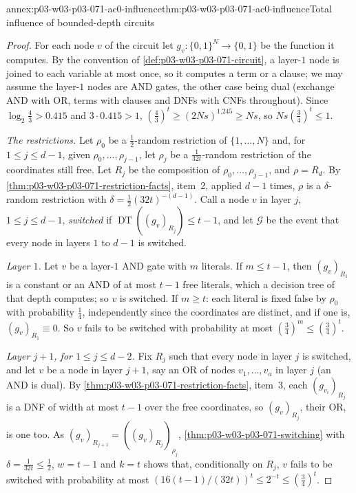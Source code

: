 \begin{annexitem}{annex:p03-w03-p03-071-ac0-influence}{thm:p03-w03-p03-071-ac0-influence}{Total influence of bounded-depth circuits}
\begin{proof}
For each node \(v\) of the circuit let \(g_v:\{0,1\}^N\to\{0,1\}\) be the
function it computes.  By the convention of
\cref{def:p03-w03-p03-071-circuit}, a layer-\(1\) node is joined to each
variable at most once, so it computes a term or a clause; we may assume the
layer-\(1\) nodes are AND gates, the other case being dual (exchange AND
with OR, terms with clauses and DNFs with CNFs throughout).  Since
\(\log_2\frac43>0.415\) and \(3\cdot0.415>1\),
\((\frac43)^t\geq(2Ns)^{1.245}\geq Ns\), so \(Ns(\frac34)^t\leq1\).

\emph{The restrictions.}  Let \(\rho_0\) be a \(\frac12\)-random restriction
of \(\{1,\ldots,N\}\) and, for \(1\leq j\leq d-1\), given
\(\rho_0,\ldots,\rho_{j-1}\), let \(\rho_j\) be a \(\frac1{32t}\)-random
restriction of the coordinates still free.  Let \(R_j\) be the composition
of \(\rho_0,\ldots,\rho_{j-1}\), and \(\rho=R_d\).  By
\cref{thm:p03-w03-p03-071-restriction-facts}, item~2, applied \(d-1\) times,
\(\rho\) is a \(\delta\)-random restriction with
\(\delta=\frac12(32t)^{-(d-1)}\).  Call a node \(v\) in layer \(j\),
\(1\leq j\leq d-1\), \emph{switched} if
\(\operatorname{DT}((g_v)_{R_j})\leq t-1\), and let \(\mathcal G\) be the
event that every node in layers \(1\) to \(d-1\) is switched.

\emph{Layer \(1\).}  Let \(v\) be a layer-\(1\) AND gate with \(m\)
literals.  If \(m\leq t-1\), then \((g_v)_{R_1}\) is a constant or an AND of
at most \(t-1\) free literals, which a decision tree of that depth computes;
so \(v\) is switched.  If \(m\geq t\): each literal is fixed false by
\(\rho_0\) with probability \(\frac14\), independently since the
coordinates are distinct, and if one is, \((g_v)_{R_1}\equiv0\).  So \(v\)
fails to be switched with probability at most \((\frac34)^m\leq(\frac34)^t\).

\emph{Layer \(j+1\), for \(1\leq j\leq d-2\).}  Fix \(R_j\) such that every
node in layer \(j\) is switched, and let \(v\) be a node in layer \(j+1\),
say an OR of nodes \(v_1,\ldots,v_a\) in layer \(j\) (an AND is dual).  By
\cref{thm:p03-w03-p03-071-restriction-facts}, item~3, each
\((g_{v_i})_{R_j}\) is a DNF of width at most \(t-1\) over the free
coordinates, so \((g_v)_{R_j}\), their OR, is one too.  As
\((g_v)_{R_{j+1}}=((g_v)_{R_j})_{\rho_j}\),
\cref{thm:p03-w03-p03-071-switching} with \(\delta=\frac1{32t}\leq\frac12\),
\(w=t-1\) and \(k=t\) shows that, conditionally on \(R_j\), \(v\) fails to
be switched with probability at most \((16(t-1)/(32t))^t\leq2^{-t}\leq
(\frac34)^t\).


\end{proof}
\end{annexitem}
